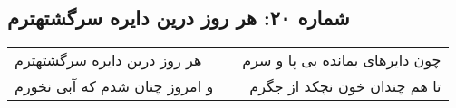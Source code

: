\begin{center}
\section*{شماره ۲۰: هر روز درین دایره سرگشتهترم}
\label{sec:020}
\begin{longtable}{l p{0.5cm} r}
هر روز درین دایره سرگشتهترم
&&
چون دایرهای بمانده بی پا و سرم
\\
و امروز چنان شدم که آبی نخورم
&&
تا هم چندان خون نچکد از جگرم
\\
\end{longtable}
\end{center}
